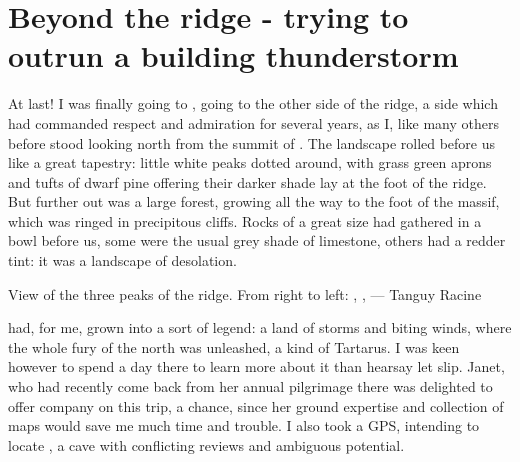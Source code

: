 \section{Beyond the ridge - trying to outrun a building thunderstorm}
\begin{marginfigure}
\end{marginfigure}
At last! I was finally going to , going to the other side of the ridge, a side which had commanded respect and admiration for several years, as I, like many others before stood looking north from the summit of . The landscape rolled before us like a great  tapestry: little white peaks dotted around, with grass green aprons and tufts of dwarf pine offering their darker shade lay at the foot of the ridge. But further out was a large forest, growing all the way to the foot of the  massif, which was ringed in precipitous cliffs. Rocks of a great size had gathered in a bowl before us, some were the usual grey shade of limestone, others had a redder tint: it was a landscape of desolation.

\begin{marginfigure}
    \checkoddpage \ifoddpage \forcerectofloat \else \forceversofloat \fi
    \centering
    \label{AreaNrob}
    \caption{View of the three peaks of the ridge. From right to left: \protect{}, \protect{}, \protect{} --- Tanguy Racine}
\end{marginfigure}

 had, for me, grown into a sort of legend: a land of storms and biting winds, where the whole fury of the north was unleashed, a kind of Tartarus. I was keen however to spend a day there to learn more about it than hearsay let slip. Janet, who had recently come back from her annual pilgrimage there was delighted to offer company on this trip, a chance, since her ground expertise and collection of maps would save me much time and trouble. I also took a GPS, intending to locate , a cave with conflicting reviews and ambiguous potential. 


